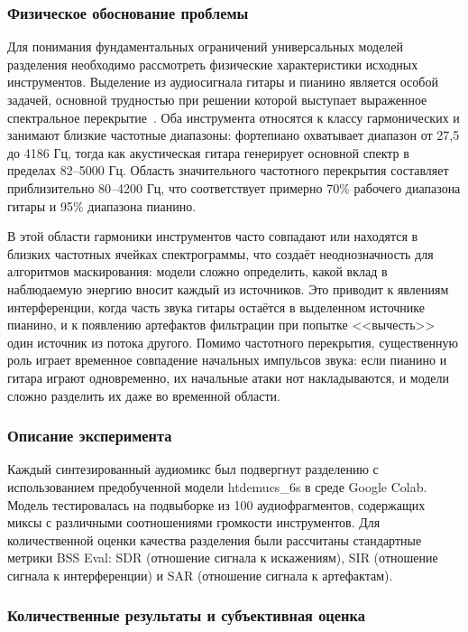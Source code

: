\documentclass[14pt]{extarticle}
\begin{document}
\subsubsection{Физическое обоснование проблемы}

Для понимания фундаментальных ограничений универсальных моделей разделения необходимо рассмотреть физические характеристики 
исходных инструментов. Выделение из аудиосигнала гитары и пианино является особой задачей, основной трудностью при решении 
которой выступает выраженное спектральное перекрытие~\cite{metrics, polyphonic_audio}. Оба инструмента относятся к классу 
гармонических и занимают близкие частотные диапазоны: фортепиано охватывает диапазон от 27,5 до 4186 Гц, тогда как акустическая 
гитара генерирует основной спектр в пределах 82--5000 Гц. Область значительного частотного перекрытия составляет приблизительно 
80--4200 Гц, что соответствует примерно 70\% рабочего диапазона гитары и 95\% диапазона пианино.

В этой области гармоники инструментов часто совпадают или находятся в близких частотных ячейках спектрограммы, что создаёт 
неоднозначность для алгоритмов маскирования: модели сложно определить, какой вклад в наблюдаемую энергию вносит каждый из 
источников. Это приводит к явлениям интерференции, когда часть звука гитары остаётся в выделенном источнике пианино, и к 
появлению артефактов фильтрации при попытке <<вычесть>> один источник из потока другого. Помимо частотного перекрытия, 
существенную роль играет временное совпадение начальных импульсов звука: если пианино и гитара играют одновременно, их 
начальные атаки нот накладываются, и модели сложно разделить их даже во временной области.

\subsubsection{Описание эксперимента}

Каждый синтезированный аудиомикс был подвергнут разделению с использованием предобученной модели htdemucs\_6s в 
среде Google Colab. Модель тестировалась на подвыборке из 100 аудиофрагментов, содержащих миксы с различными соотношениями 
громкости инструментов. Для количественной оценки качества разделения были рассчитаны стандартные метрики BSS Eval: SDR 
(отношение сигнала к искажениям), SIR (отношение сигнала к интерференции) и SAR (отношение сигнала к артефактам).

\subsubsection{Количественные результаты и субъективная оценка}
\end{document}
